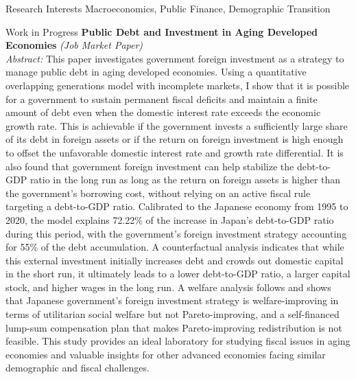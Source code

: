 \documentclass{cv} %
\begin{document}
\begin{rSection}{Research Interests}
Macroeconomics, Public Finance, Demographic Transition
\end{rSection}
\bigskip
\begin{rSection}{Work in Progress}
\medskip
{\bf Public Debt and Investment in Aging Developed Economies} \emph{(Job Market Paper)} \\
\begin{adjustbox}{minipage=0.95\textwidth, right}
	\vspace{0.3em} {\emph{Abstract:} This paper investigates government foreign investment as a strategy to manage public debt in aging developed economies. Using a quantitative overlapping generations model with incomplete markets, I show that it is possible for a government to sustain permanent fiscal deficits and maintain a finite amount of debt even when the domestic interest rate exceeds the economic growth rate. This is achievable if the government invests a sufficiently large share of its debt in foreign assets or if the return on foreign investment is high enough to offset the unfavorable domestic interest rate and growth rate differential. It is also found that government foreign investment can help stabilize the debt-to-GDP ratio in the long run as long as the return on foreign assets is higher than the government's borrowing cost, without relying on an active fiscal rule targeting a debt-to-GDP ratio. Calibrated to the Japanese economy from 1995 to 2020, the model explains 72.22\% of the increase in Japan's debt-to-GDP ratio during this period, with the government's foreign investment strategy accounting for 55\% of the debt accumulation. A counterfactual analysis indicates that while this external investment initially increases debt and crowds out domestic capital in the short run, it ultimately leads to a lower debt-to-GDP ratio, a larger capital stock, and higher wages in the long run. A welfare analysis follows and shows that Japanese government's foreign investment strategy is welfare-improving in terms of utilitarian social welfare but not Pareto-improving, and a self-financed lump-sum compensation plan that makes Pareto-improving redistribution is not feasible. This study provides an ideal laboratory for studying fiscal issues in aging economies and valuable insights for other advanced economies facing similar demographic and fiscal challenges.}
\end{adjustbox}


\end{rSection}
\end{document}
